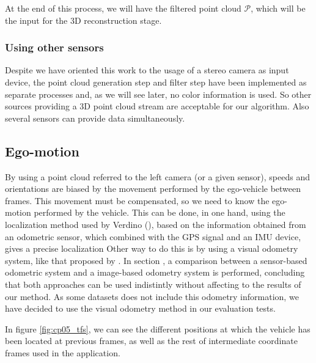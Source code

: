 At the end of this process, we will have the filtered point cloud $\mathcal{P}$, which will be the input for the 3D reconstruction stage.

\subsubsection{Using other sensors}\label{ch:chapter05_01_01_02}

Despite we have oriented this work to the usage of a stereo camera as input device, the point cloud generation step and filter step have been implemented as separate processes and, as we will see later, no color information is used. So other sources providing a 3D point cloud stream are acceptable for our algorithm. Also several sensors can provide data simultaneously.

\subsection{Ego-motion}\label{ch:chapter05_01_02}

By using a point cloud referred to the left camera (or a given sensor), speeds and orientations are biased by the movement performed by the ego-vehicle between frames. This movement must be compensated, so we need to know the ego-motion performed by the vehicle. This can be done, in one hand, using the localization method used by Verdino (\cite{Perea2013mcl}), based on the information obtained from an odometric sensor, which combined with the \ac{GPS} signal and an \ac{IMU} device, gives a precise localization Other way to do this is by using a visual odometry system, like that proposed by \cite{geiger2011stereoscan}. In section , a comparison between a sensor-based odometric system and a image-based odometry system is performed, concluding that both approaches can be used indistintly without affecting to the results of our method. As some datasets does not include this odometry information, we have decided to use the visual odometry method in our evaluation tests.

In figure \ref{fig:cp05_tfs}, we can see the different positions at which the vehicle has been located at previous frames, as well as the rest of intermediate coordinate frames used in the application.

